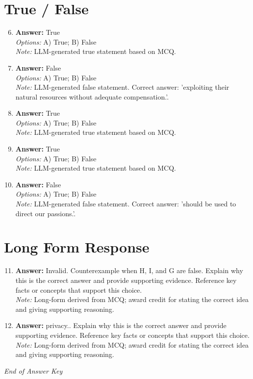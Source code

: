 \documentclass[12pt]{article}
\begin{document}
\section*{True / False}
\begin{enumerate}[label=\arabic*.]
\setcounter{enumi}{5}
\item \textbf{Answer:} True
\\ \textit{Options:} A) True; B) False
\\ \textit{Note:} LLM-generated true statement based on MCQ.
\item \textbf{Answer:} False
\\ \textit{Options:} A) True; B) False
\\ \textit{Note:} LLM-generated false statement. Correct answer: 'exploiting their natural resources without adequate compensation.'.
\item \textbf{Answer:} True
\\ \textit{Options:} A) True; B) False
\\ \textit{Note:} LLM-generated true statement based on MCQ.
\item \textbf{Answer:} True
\\ \textit{Options:} A) True; B) False
\\ \textit{Note:} LLM-generated true statement based on MCQ.
\item \textbf{Answer:} False
\\ \textit{Options:} A) True; B) False
\\ \textit{Note:} LLM-generated false statement. Correct answer: 'should be used to direct our passions.'.
\end{enumerate}

\section*{Long Form Response}
\begin{enumerate}[label=\arabic*.]
\setcounter{enumi}{10}
\item \textbf{Answer:} Invalid. Counterexample when H, I, and G are false. Explain why this is the correct answer and provide supporting evidence. Reference key facts or concepts that support this choice.
\\ \textit{Note:} Long-form derived from MCQ; award credit for stating the correct idea and giving supporting reasoning.
\item \textbf{Answer:} privacy.. Explain why this is the correct answer and provide supporting evidence. Reference key facts or concepts that support this choice.
\\ \textit{Note:} Long-form derived from MCQ; award credit for stating the correct idea and giving supporting reasoning.
\end{enumerate}

\vfill
\noindent\textit{End of Answer Key}
\end{document}
